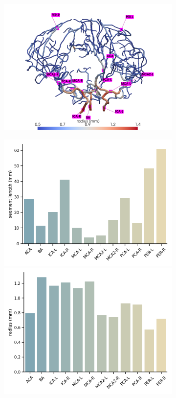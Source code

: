 \documentclass[fleqn,10pt]{wlscirep}
\begin{document}
\begin{figure}
    \centering
    \begin{subfigure}[b]{0.65\textwidth}
    \centering
    \includegraphics[width = \linewidth]{figures/labeled_arteries.png}
    \end{subfigure}
     \begin{subfigure}[b]{0.3\textwidth}
    \centering
    \includegraphics[width =  \linewidth]{figures/vasomotion_arteries_labels_length.png}
    \includegraphics[width =  \linewidth]{figures/vasomotion_arteries_labels_radius.png}

\end{subfigure}
\end{figure}
\end{document}
